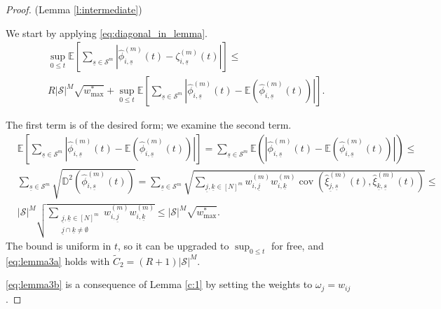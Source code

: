 \documentclass{article}
\newcommand{\ul}{\underline}
\newcommand{\E}{\mathbb{E}}
\newcommand{\1}[1]{{\mathds{1}}_{\left\{#1\right\}}}
\renewcommand{\S}{\mathcal{S}}
\DeclareMathOperator{\cov}{cov}
\newcommand{\remm}[1]{{#1}}
\begin{document}
	\begin{proof}(Lemma \ref{l:intermediate})
		
		We start by applying \eqref{eq:diagonal_in_lemma}.	
		\begin{align*}
			&\sup_{0 \leq t}\E \left[ \sum_{\underline{s} \in \S^m} \left|\hat{\phi}_{i,\underline{s}}^{(m)}(t)-\zeta_{i,\underline{s}}^{(m)}(t) \right| \right] \leq\\
			& R \left |\S \right|^M \sqrt{\remm{w_{\max}^{*}}}+\sup_{0 \leq t}\E \left[ \sum_{\underline{s} \in \S^m} \left|\hat{\phi}_{i,\underline{s}}^{(m)}(t)-\E \left(\hat{\phi}_{i,\underline{s}}^{(m)}(t) \right) \right| \right].
		\end{align*}
		
		The first term is of the desired form; we examine the second term.
		\begin{align*}
			&\E \left[ \sum_{\underline{s} \in \S^m} \left|\hat{\phi}_{i,\underline{s}}^{(m)}(t)-\E \left(\hat{\phi}_{i,\underline{s}}^{(m)}(t) \right) \right| \right]=\sum_{\underline{s} \in \S^m}\E \left( \left|\hat{\phi}_{i,\underline{s}}^{(m)}(t)-\E \left(\hat{\phi}_{i,\underline{s}}^{(m)}(t) \right) \right| \right) \leq \\
			&\sum_{\underline{s} \in \S^m} \sqrt{\mathbb{D}^2 \left( \hat{\phi}_{i,\underline{s}}^{(m)}(t) \right)}=\remm{\sum_{\underline{s} \in \S^m} \sqrt{\sum_{\underline{j}, \ul{k} \in [N]^m} w_{i, \underline{j}}^{(m)}w_{i, \underline{k}}^{(m)} \cov \left( \hat{\xi}_{\underline{j},\underline{s}}^{(m)}(t),\hat{\xi}_{\underline{k},\underline{s}}^{(m)}(t) \right)} \leq} \\
			& \remm{\left |\S \right|^M \sqrt{\sum_{\substack{\underline{j}, \ul{k} \in [N]^m \\ \ul{j} \cap \ul{k} \neq \emptyset}} w_{i, \underline{j}}^{(m)}w_{i, \underline{k}}^{(m)}  } \leq \left |\S \right|^M \sqrt{w_{\max}^{*}}}. 
		\end{align*}
		The bound is uniform in $t$, so it can be upgraded to $\sup_{0\leq t}$ for free, and \eqref{eq:lemma3a} holds with $\tilde{C}_2=\remm{\left(R+1\right)}\left|\S \right|^M.$
		
		\remm{ \eqref{eq:lemma3b} is a consequence of Lemma \ref{c:1} by setting the weights to $\omega_{j}=w_{ij}$.}
	\end{proof}	
	
\end{document}
